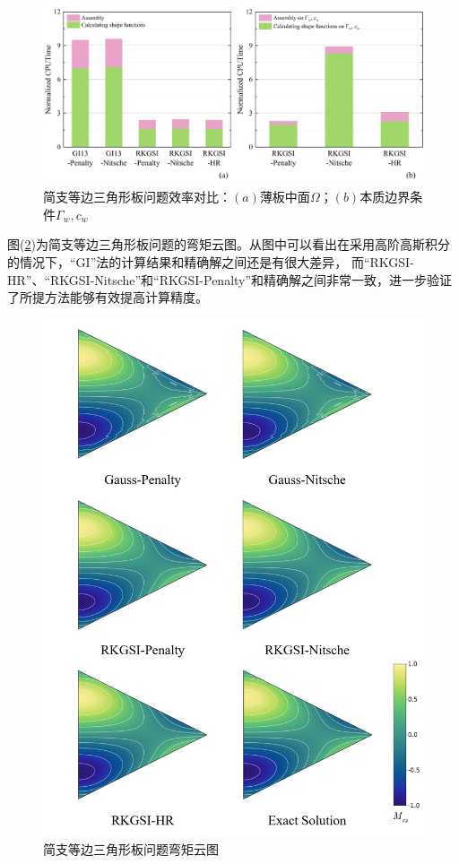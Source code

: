 \begin{figure}[!h]
    \centering
    \includegraphics[scale=0.6]{figure/P/T/cauclate.png}
    \caption{简支等边三角形板问题效率对比：$(a)$薄板中面$\Omega$；$(b)$本质边界条件$\Gamma_w,c_w$}\label{Tcauclate}
\end{figure}\newpage
图(\ref{TMnn})为简支等边三角形板问题的弯矩云图。从图中可以看出在采用高阶高斯积分的情况下，“GI”法的计算结果和精确解之间还是有很大差异，
而“RKGSI-HR”、“RKGSI-Nitsche”和“RKGSI-Penalty”和精确解之间非常一致，进一步验证了所提方法能够有效提高计算精度。
\begin{figure}[!h]
    \centering
    \includegraphics[scale=0.6]{figure/P/T/Mnn.png}
    \caption{简支等边三角形板问题弯矩云图}\label{TMnn}
\end{figure}\newpage
